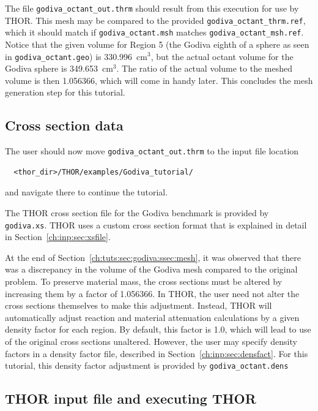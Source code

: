 The file \verb"godiva_octant_out.thrm" should result from this execution for use by THOR.
This mesh may be compared to the provided \verb"godiva_octant_thrm.ref", which it should match if \verb"godiva_octant.msh" matches \verb"godiva_octant_msh.ref".
Notice that the given volume for Region 5 (the Godiva eighth of a sphere as seen in \verb"godiva_octant.geo") is 330.996~cm$^3$, but the actual octant volume for the Godiva sphere is 349.653~cm$^3$.
The ratio of the actual volume to the meshed volume is then 1.056366, which will come in handy later.
This concludes the mesh generation step for this tutorial.

\subsection{Cross section data}

The user should now move \verb"godiva_octant_out.thrm" to the input file location
\begin{verbatim}
  <thor_dir>/THOR/examples/Godiva_tutorial/
\end{verbatim}
and navigate there to continue the tutorial.

The \ac{THOR} cross section file for the Godiva benchmark is provided by \verb"godiva.xs".
\ac{THOR} uses a custom cross section format that is explained in detail in Section~\ref{ch:inp:sec:xsfile}.

At the end of Section~\ref{ch:tuts:sec:godiva:ssec:mesh}, it was observed that there was a discrepancy in the volume of the Godiva mesh compared to the original problem.
To preserve material mass, the cross sections must be altered by increasing them by a factor of 1.056366.
In \ac{THOR}, the user need not alter the cross sections themselves to make this adjustment.
Instead, \ac{THOR} will automatically adjust reaction and material attenuation calculations by a given density factor for each region.
By default, this factor is 1.0, which will lead to use of the original cross sections unaltered.
However, the user may specify density factors in a density factor file, described in Section~\ref{ch:inp:sec:densfact}.
For this tutorial, this density factor adjustment is provided by \verb"godiva_octant.dens"

\subsection{THOR input file and executing THOR}

